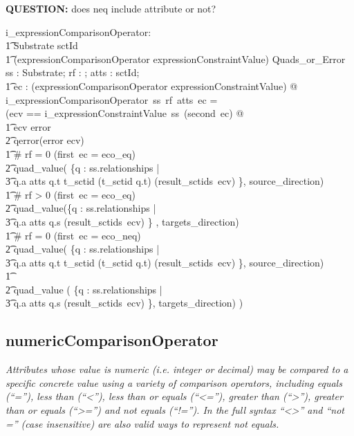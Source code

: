 \documentclass{article}
\def\desc#1{{\small \textsl{{#1}} }}
\begin{document}
\textbf{QUESTION:} does neq include attribute or not?
\begin{axdef}
   i\_expressionComparisonOperator: \\
\t1 Substrate \fun \optional[reverseFlag] \fun \power sctId \fun \\
\t1 (expressionComparisonOperator \cross expressionConstraintValue) \fun Quads\_or\_Error
\where
    \forall ss : Substrate; rf : \optional[reverseFlag]; atts : \power sctId; \\
\t1 ec : (expressionComparisonOperator \cross expressionConstraintValue)  @ \\
    i\_expressionComparisonOperator~ss~rf~atts~ec = \\
    (\LET ecv == i\_expressionConstraintValue~ss~(second~ec) @ \\
\t1 \IF ecv \in \ran error \THEN \\
\t2 qerror(error \inv ecv) \\
\t1 \ELSE \IF \# rf = 0 \land (first~ec =  eco\_eq) \THEN \\
\t2 quad\_value( \{q : ss.relationships | \\
\t3 q.a \in atts \land q.t \in \ran t\_sctid \land (t\_sctid \inv q.t) \in (result\_sctids~ecv) \}, source\_direction) \\
\t1 \ELSE \IF \# rf > 0  \land (first~ec =  eco\_eq) \THEN \\
\t2 quad\_value(\{q : ss.relationships | \\
\t3 q.a \in atts \land q.s \in (result\_sctids~ecv) \} , targets\_direction) \\
\t1  \ELSE \IF \# rf = 0  \land (first~ec =  eco\_neq) \THEN \\
\t2 quad\_value( \{q : ss.relationships | \\
\t3 q.a \in atts \land q.t \in \ran t\_sctid \land (t\_sctid \inv q.t) \notin (result\_sctids~ecv) \}, source\_direction) \\
\t1 \ELSE \\
\t2 quad\_value ( \{q : ss.relationships | \\
\t3 q.a \in atts \land q.s \notin (result\_sctids~ecv) \}, targets\_direction) )
 \end{axdef}
 
 \subsection{numericComparisonOperator}
\begin{framed}
\desc{Attributes whose value is numeric (i.e. integer or decimal) may be compared to a specific concrete value using a variety of comparison operators, including equals (``=''), less than (``\textless''), less than or equals (``\textless=''), greater than (``\textgreater''), greater than or equals (``\textgreater='') and not equals (``!=''). In the full syntax ``\textless\textgreater'' and ``not ='' (case insensitive) are also valid ways to represent not equals.}
\end{framed}
\end{document}
